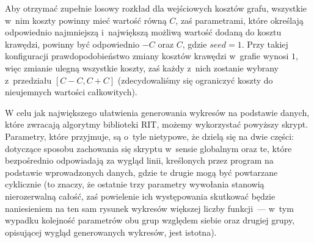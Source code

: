 Aby otrzymać zupełnie losowy rozkład dla wejściowych kosztów grafu, wszystkie w~nim koszty powinny mieć wartość równą $C$, zaś parametrami, które określają odpowiednio najmniejszą i~największą możliwą wartość dodaną do kosztu krawędzi, powinny być odpowiednio $-C$ oraz $C$, gdzie $seed = 1$.
Przy takiej konfiguracji prawdopodobieństwo zmiany kosztów krawędzi w~grafie wynosi $1$, więc zmianie ulegną wszystkie koszty, zaś każdy z~nich zostanie wybrany z~przedziału $\left[ C - C, C + C \right]$ (zdecydowaliśmy się ograniczyć koszty do nieujemnych wartości całkowitych).


W celu jak największego ułatwienia generowania wykresów na podstawie danych, które zwracają algorytmy biblioteki \textsc{RIT}, możemy wykorzystać powyższy skrypt.
Parametry, które przyjmuje, są o~tyle nietypowe, że dzielą się na dwie części: dotyczące sposobu zachowania się skryptu w~sensie globalnym oraz te, które bezpośrednio odpowiadają za wygląd linii, kreślonych przez program na podstawie wprowadzonych danych, gdzie te drugie mogą być powtarzane cyklicznie (to znaczy, że ostatnie trzy parametry wywołania stanowią nierozerwalną całość, zaś powielenie ich występowania skutkować będzie naniesieniem na ten sam rysunek wykresów większej liczby funkcji~--- w~tym wypadku kolejność parametrów obu grup względem siebie oraz drugiej grupy, opisującej wygląd generowanych wykresów, jest istotna).

